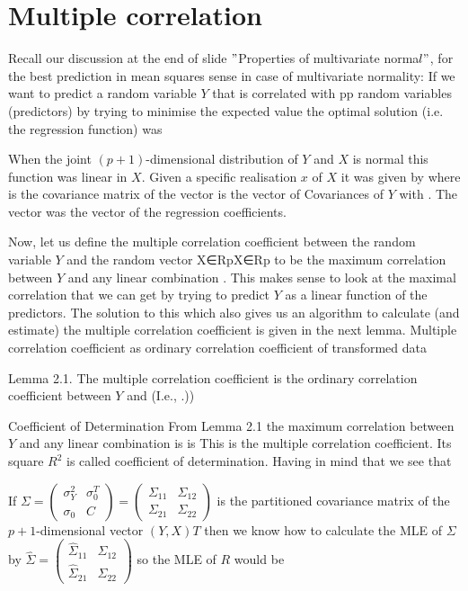 \documentclass[11pt]{article}
\begin{document}
\section{Multiple correlation}\label{sec:multiple-correlation}
Recall our discussion at the end of slide \("\)Properties of multivariate
norma\(l"\), for the best prediction in mean squares sense in case of
multivariate normality: If we want to predict a random variable $Y$ that is
correlated with pp random variables (predictors)  by trying to minimise the
expected value  the optimal solution (i.e. the regression function) was

When the joint $(p+1)$-dimensional distribution of $Y$ and $X$ is normal
this function was linear in $X$.
Given a specific realisation $x$ of $X$ it was given by  where  is the
covariance matrix of the vector  is the vector of Covariances of $Y$ with .
The vector  was the vector of the regression coefficients.

Now, let us define the multiple correlation coefficient between the random
variable $Y$ and the random vector X∈RpX∈Rp to be the maximum correlation
between $Y$ and any linear combination .
This makes sense to look at the maximal correlation that we can get by
trying to predict $Y$ as a linear function of the predictors.
The solution to this which also gives us an algorithm to calculate (and
estimate) the multiple correlation coefficient is given in the next lemma.
Multiple correlation coefficient as ordinary correlation coefficient of
transformed data

Lemma 2.1.
The multiple correlation coefficient is the ordinary correlation
coefficient between $Y$ and (I.e., .))

Coefficient of Determination From Lemma 2.1 the maximum correlation between
$Y$ and any linear combination  is  is
This is the multiple correlation coefficient.
Its square $R^2$ is called coefficient of determination.
Having in mind that  we see that


If $\Sigma = \begin{pmatrix} \sigma_{Y}^{2} & \sigma_{0}^{T} \\ \sigma_{0} & C \end{pmatrix} = \begin{pmatrix} \Sigma_{11} & \Sigma_{12} \\ \Sigma_{21} & \Sigma_{22} \end{pmatrix}$
is the partitioned covariance  matrix of the $p+1$-dimensional vector $(Y,X)T$
then we know how to calculate the MLE of $\Sigma$ by $\hat{\Sigma} = \begin{pmatrix} \hat{\Sigma}_{11} & \hat{\Sigma}_{12} \\ \hat{\Sigma}_{21} & \hat{\Sigma}_{22} \end{pmatrix}$
so the MLE of $R$ would be $$
\end{document}
